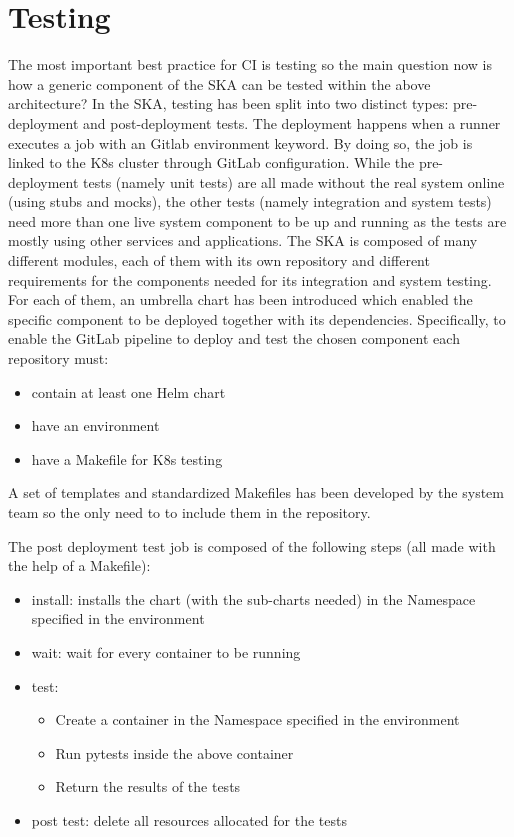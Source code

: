 \documentclass[a4paper,
               keeplastbox,   %
               ]{jacow}
\begin{document}
\section{Testing}
The most important best practice for CI is testing so the main question now is how a generic component of the SKA can be tested within the above architecture?
In the SKA, testing has been split into two distinct types: pre-deployment and post-deployment tests. The deployment happens when a runner executes a job with an Gitlab environment keyword. By doing so, the job is linked to the K8s cluster through GitLab configuration.
While the pre-deployment tests (namely unit tests) are all made without the real system online (using stubs and mocks), the other tests (namely integration and system tests) need more than one live system component to be up and running as the tests are mostly using other services and applications.
The SKA is composed of many different modules, each of them with its own repository and different requirements for the components needed for its integration and system testing. For each of them, an umbrella chart has been introduced which enabled the specific component to be deployed together with its dependencies.
Specifically, to enable the GitLab pipeline to deploy and test the chosen component each repository must:
\begin{itemize}
    \item contain at least one Helm chart
    \item have an environment
    \item have a Makefile for K8s testing
\end{itemize}

A set of templates and standardized Makefiles has been developed by the system team so the only need to to include them in the repository. 

The post deployment test job is composed of the following steps (all made with the help of a Makefile):
\begin{itemize}
    \item install: installs the chart (with the sub-charts needed) in the Namespace specified in the environment
    \item wait: wait for every container to be running
    \item test:
    \begin{itemize}
        \item Create a container in the Namespace specified in the environment
        \item Run pytests inside the above container
        \item Return the results of the tests
    \end{itemize}
    \item post test: delete all resources allocated for the tests
\end{itemize}
\end{document}
